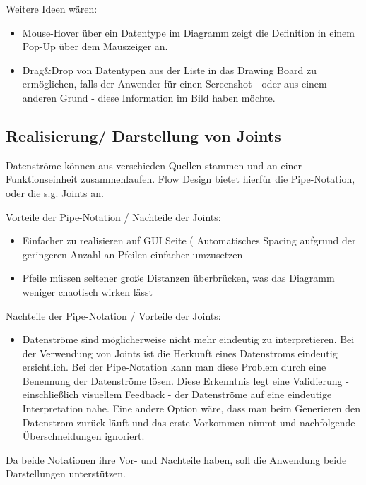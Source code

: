 Weitere Ideen wären: 
\begin{itemize}
\item Mouse-Hover über ein Datentype im Diagramm zeigt die Definition in einem Pop-Up
über dem Mauszeiger an.
\item Drag\&Drop von Datentypen aus der Liste in das Drawing Board zu
ermöglichen, falls der Anwender für einen Screenshot - oder aus einem anderen
Grund - diese Information im Bild haben möchte.
\end{itemize}


\subsection{Realisierung/ Darstellung von Joints}

Datenströme können aus verschieden Quellen stammen und an einer Funktionseinheit
zusammenlaufen. Flow Design bietet hierfür die Pipe-Notation, oder die s.g. Joints
an. 

\bigskip

Vorteile der Pipe-Notation / Nachteile der Joints:

\begin{itemize}
\item Einfacher zu realisieren auf GUI Seite ( Automatisches Spacing aufgrund der
geringeren Anzahl an Pfeilen einfacher umzusetzen
\item Pfeile müssen seltener große Distanzen überbrücken, was das Diagramm weniger
chaotisch wirken lässt
\end{itemize}

Nachteile der Pipe-Notation / Vorteile der Joints:

\begin{itemize}
\item Datenströme sind möglicherweise nicht mehr eindeutig zu interpretieren. Bei
der Verwendung von Joints ist die Herkunft eines Datenstroms eindeutig
ersichtlich. Bei der Pipe-Notation kann man diese Problem durch eine Benennung
der Datenströme lösen. Diese Erkenntnis legt eine Validierung - einschließlich
visuellem Feedback - der Datenströme auf eine eindeutige Interpretation nahe.
Eine andere Option wäre, dass man beim Generieren den Datenstrom zurück läuft
und das erste Vorkommen nimmt und nachfolgende Überschneidungen ignoriert.
\end{itemize}

Da beide Notationen ihre Vor- und Nachteile haben, soll die Anwendung beide Darstellungen unterstützen.

